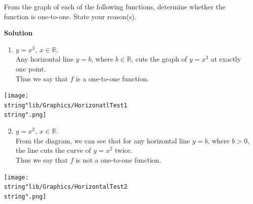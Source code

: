\documentclass[11pt,a4paper]{book}
\newcommand{\R}{\mathbb{R}}
\begin{document}
\begin{example}{}
From the graph of each of the following functions, determine whether
the function is one-to-one. State your reason(s).

\textbf{Solution}

\begin{minipage}[t]{0.6\textwidth}

\begin{enumerate}[label=(\alph*)]

\setcounter{enumi}{0}

\item  $y=x^{3},\:x\in\R$. \\
Any horizontal line $y=b$, where $b\in\R$, cuts the graph of $y=x^{3}$
at exactly one point. \\
Thus we say that $f$ is a one-to-one function.

\end{enumerate}

\end{minipage}
\begin{minipage}[t]{0.1\textwidth}
\begin{center}
\texttt{[image: \\string"lib/Graphics/HorizonatlTest1\\string".png]}
\par\end{center}

\end{minipage}

\begin{minipage}[t]{0.6\textwidth}

\begin{enumerate}[label=(\alph*)]

\setcounter{enumi}{1}

\item  $y=x^{2},\:x\in\R$. \\
From the diagram, we can see that for any horizontal line $y=b$,
where $b>0$, the line cuts the curve of $y=x^{2}$ twice.\\
Thus we say that $f$ is not a one-to-one function.

\end{enumerate}

\end{minipage}
\begin{minipage}[t]{0.1\textwidth}
\begin{center}
\texttt{[image: \\string"lib/Graphics/HorizontalTest2\\string".png]}
\par\end{center}


\end{minipage}
\end{example}
\end{document}
